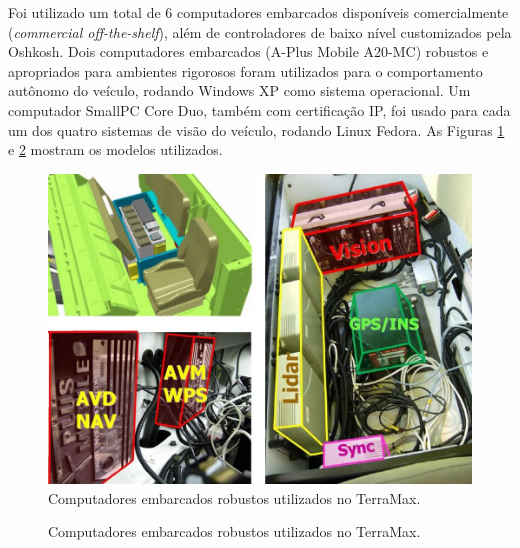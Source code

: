 Foi utilizado um total de 6 computadores embarcados disponíveis comercialmente (\emph{commercial off-the-shelf}), além de controladores de baixo nível customizados pela Oshkosh. Dois computadores embarcados (A-Plus Mobile A20-MC) robustos e apropriados para ambientes rigorosos foram utilizados para o comportamento autônomo do veículo, rodando Windows XP como sistema operacional. Um computador SmallPC Core Duo, também com certificação IP, foi usado para cada um dos quatro sistemas de visão do veículo, rodando Linux Fedora. As Figuras \ref{fig:EE} e \ref{fig:computadores} mostram os modelos utilizados.

\begin{figure}[!h]
\centering
\includegraphics[width=0.75\columnwidth]{figs/EE.jpg}
\caption{Computadores embarcados robustos utilizados no TerraMax.}%
\label{fig:EE}%
\end{figure}

\begin{figure}[!h]
\centering
{}\quad
{}
\caption{Computadores embarcados robustos utilizados no TerraMax.}%
\label{fig:computadores}%
\end{figure}

